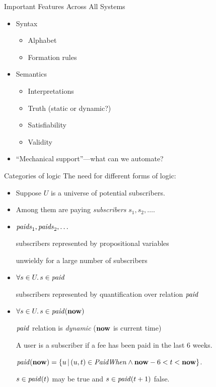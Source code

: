 \documentclass[style=sailor,size=12pt]{powerdot}
\newcommand{\id}[1]{\mbox{\it #1\/}}
\newcommand{\bid}[1]{\mbox{\bf #1}}
\begin{document}
\begin{wideslide}[bm=,toc=]{Important Features Across All Systems} 
\begin{itemize}
\item Syntax
\begin{itemize}
\item<2-> Alphabet 
\item<2-> Formation rules
\end{itemize}
\item Semantics
\begin{itemize}
\item<3-> Interpretations
\item<3-> Truth (static or dynamic?)
\item<3-> Satisfiability
\item<3-> Validity
\end{itemize}
\item<4-> ``Mechanical support''---what can we automate?
\end{itemize}

\end{wideslide}


\begin{wideslide}[bm=,toc=]{Categories of logic}
The need for different forms of logic:
\begin{itemize}
\item Suppose $U$ is a universe of potential subscribers. 

\item Among them are paying {\em subscribers\/}
$s_1, s_2,\ldots$.

\item $\id{paids}_1,\id{paids}_2,\ldots$ 

\hspace{1em}subscribers represented by propositional variables

\hspace{1em}unwieldy for a large number of subscribers

\item $\forall s\in U.\,s\in \id{paid}$  

\hspace{1em}subscribers represented by quantification over relation $\id{paid}$

\item $\forall s\in U.\,s\in \id{paid}(\bid{now})$

\hspace{1em}$\id{paid}$ relation is {\em dynamic\/} ($\bid{now}$ is current time)

A user is a subscriber if a fee has been paid in the last 6 weeks.

$\id{paid}(\bid{now}) = \{u\,|\,(u,t)\in \id{PaidWhen} \wedge \bid{now}-6 < t < \bid{now}\}$.

$s\in\id{paid}(t)$ may be true and $s\in\id{paid}(t+1)$ false.

\end{itemize}
\end{wideslide}
\end{document}
